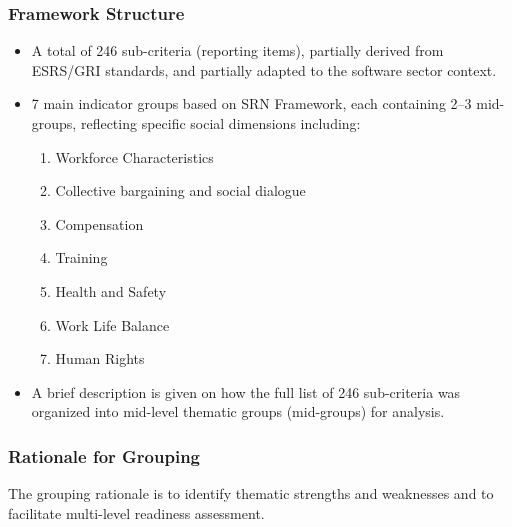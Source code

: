 \subsubsection{Framework Structure}
\begin{itemize}
    \item A total of 246 sub-criteria (reporting items), partially derived from ESRS/GRI standards, and partially adapted to the 
    software sector context.
    \item 7 main indicator groups based on SRN Framework, each containing 2--3 mid-groups, reflecting specific social dimensions including:
    \begin{enumerate}
        \item Workforce Characteristics
        \item Collective bargaining and social dialogue
        \item Compensation
        \item Training
        \item Health and Safety
        \item Work Life Balance
        \item Human Rights
    \end{enumerate}
    \item A brief description is given on 
    how the full list of 246 sub-criteria was organized into mid-level thematic groups (mid-groups) for analysis. 
\end{itemize}

\subsubsection{Rationale for Grouping}
The grouping rationale is to identify thematic strengths and weaknesses and to facilitate 
multi-level readiness assessment.

